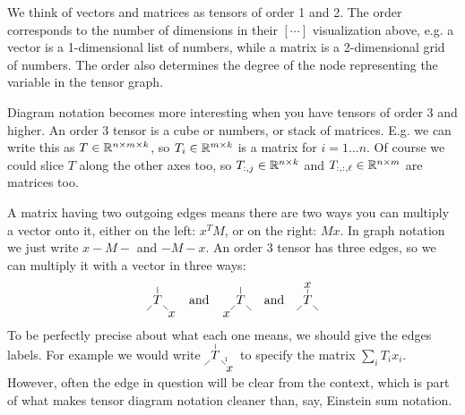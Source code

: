 We think of vectors and matrices as tensors of order 1 and 2.
The order corresponds to the number of dimensions in their $[\cdots]$ visualization above,
e.g. a vector is a 1-dimensional list of numbers, while a matrix is a 2-dimensional grid of numbers.
The order also determines the degree of the node representing the variable in the tensor graph.

Diagram notation becomes more interesting when you have tensors of order 3 and higher.
An order 3 tensor is a cube or numbers, or stack of matrices.
E.g. we can write this as $T\in\mathbb R^{n\times m\times k}$, so $T_i\in\mathbb R^{m\times k}$ is a matrix for $i=1\dots n$.
Of course we could slice $T$ along the other axes too, so $T_{:,j}\in\mathbb R^{n\times k}$ and $T_{:,:,\ell}\in\mathbb R^{n\times m}$ are matrices too.

A matrix having two outgoing edges means there are two ways you can multiply a vector onto it, either on the left: $x^T M$, or on the right: $Mx$.
In graph notation we just write $x\!-\!M\!-$ and $-M\!-\!x$.
An order 3 tensor has three edges, so we can multiply it with a vector in three ways:
\[
   \begin{tikzpicture}[baseline=(T.base), inner sep=1pt]
      \node (T) {$T$};
      \node (x) at (.4,-.4) {$x$};
      \draw (T) -- (x);
      \draw (T) -- ++(-.3,-.3);
      \draw (T) -- ++(0,.35);
   \end{tikzpicture}
   \quad
   \text{and}
   \quad
   \begin{tikzpicture}[baseline=(T.base), inner sep=1pt]
      \node (T) {$T$};
      \node (x) at (-.4,-.4) {$x$};
      \draw (T) -- (x);
      \draw (T) -- ++(.3,-.3);
      \draw (T) -- ++(0,.35);
   \end{tikzpicture}
   \quad
   \text{and}
   \quad
   \begin{tikzpicture}[baseline=(T.base), inner sep=1pt]
      \node (T) {$T$};
      \node (x) at (0,.4) {$x$};
      \draw (T) -- (x);
      \draw (T) -- ++(.3,-.3);
      \draw (T) -- ++(-.3,-.3);
   \end{tikzpicture}
\]
%
To be perfectly precise about what each one means, we should give the edges labels.
For example we would write
$
   \begin{tikzpicture}[baseline=(T.base), inner sep=1pt]
      \node (T) {$T$};
      \node (x) at (.4,-.4) {$x$};
      \draw (T) -- (x) node[midway, above right, font=\tiny] {i};
      \draw (T) -- ++(-.3,-.3);
      \draw (T) -- ++(0,.3);
   \end{tikzpicture}
$
to specify the matrix $\sum_i T_i x_i$.
However, often the edge in question will be clear from the context, which is part of
what makes tensor diagram notation cleaner than, say, Einstein sum notation.

